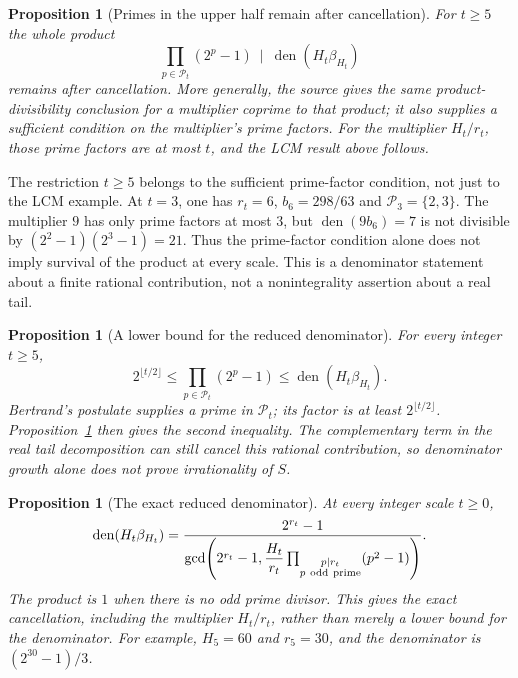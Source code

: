 \documentclass[11pt]{article}
\theoremstyle{plain}
\newtheorem{prop}[thm]{Proposition}
\theoremstyle{definition}
\theoremstyle{remark}
\let\origmathrm\mathrm
\renewcommand{\mathrm}[1]{\ifmmode\origmathrm{#1}\else\textrm{#1}\fi}%
\begin{document}
\begin{prop}[Primes in the upper half remain after cancellation]\label{catalogue:mob:b6}
For $t\ge5$ the whole product
\[
 \prod_{p\in\mathcal P_t}(2^p-1)
       \ \mid\ \operatorname{den}(H_t\beta_{H_t})
\]
remains after cancellation. More generally, the source gives the same
product-divisibility conclusion for a multiplier coprime to that product;
it also supplies a sufficient condition on the multiplier's prime factors.
For the multiplier $H_t/r_t$, those prime factors are at most $t$, and
the LCM result above follows.

\end{prop}

The restriction $t\ge5$ belongs to the sufficient prime-factor condition,
not just to the LCM example. At $t=3$, one has $r_t=6$,
$b_6=298/63$ and $\mathcal P_3=\{2,3\}$. The multiplier $9$ has only
prime factors at most $3$, but $\operatorname{den}(9b_6)=7$ is not
divisible by $(2^2-1)(2^3-1)=21$. Thus the prime-factor condition alone
does not imply survival of the product at every scale.
This is a denominator statement about a finite rational contribution,
not a nonintegrality assertion about a real tail.


\begin{prop}[A lower bound for the reduced denominator]\label{catalogue:mob:b7a}
For every integer $t\ge5$,
\[
 2^{\lfloor t/2\rfloor}
 \le \prod_{p\in\mathcal P_t}(2^p-1)
 \le \operatorname{den}(H_t\beta_{H_t}).
\]
Bertrand's postulate supplies a prime in $\mathcal P_t$; its factor is
at least $2^{\lfloor t/2\rfloor}$. Proposition~\ref{catalogue:mob:b6}
then gives the second inequality. The complementary term in the real
tail decomposition can still cancel this rational contribution, so
denominator growth alone does not prove irrationality of $S$.
\end{prop}

\begin{prop}[The exact reduced denominator]\label{catalogue:mob:b7b}
At every integer scale $t\ge0$,
\[
 \operatorname{den}(H_t\beta_{H_t})
 =\frac{2^{r_t}-1}
 {\gcd\!\left(2^{r_t}-1,
       \dfrac{H_t}{r_t}
       \prod_{\substack{p\mid r_t\\p\ \mathrm{odd\ prime}}}(p^2-1)\right)}.
\]
The product is $1$ when there is no odd prime divisor. This gives the
exact cancellation, including the multiplier $H_t/r_t$, rather than
merely a lower bound for the denominator. For example, $H_5=60$ and
$r_5=30$, and the denominator is $(2^{30}-1)/3$.
\end{prop}
\end{document}
